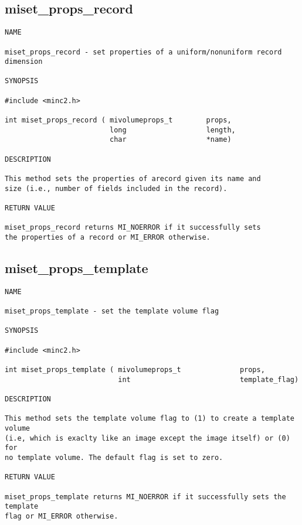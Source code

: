\documentclass{article}
\begin{document}
\subsection{miset\_props\_record}
\begin{verbatim}
NAME

miset_props_record - set properties of a uniform/nonuniform record dimension

SYNOPSIS

#include <minc2.h>

int miset_props_record ( mivolumeprops_t        props,
                         long                   length,
                         char                   *name)

DESCRIPTION

This method sets the properties of arecord given its name and
size (i.e., number of fields included in the record).

RETURN VALUE

miset_props_record returns MI_NOERROR if it successfully sets
the properties of a record or MI_ERROR otherwise.
\end{verbatim}

\subsection{miset\_props\_template}
\begin{verbatim}
NAME

miset_props_template - set the template volume flag

SYNOPSIS

#include <minc2.h>

int miset_props_template ( mivolumeprops_t              props,
                           int                          template_flag)          

DESCRIPTION

This method sets the template volume flag to (1) to create a template volume
(i.e, which is exaclty like an image except the image itself) or (0) for
no template volume. The default flag is set to zero.

RETURN VALUE

miset_props_template returns MI_NOERROR if it successfully sets the template
flag or MI_ERROR otherwise.
\end{verbatim}






\end{document}
